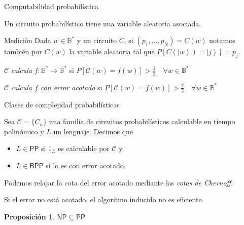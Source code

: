 \documentclass[ignorenonframetext,aspectratio=43,]{beamer}
\providecommand{\tightlist}{%
  \setlength{\itemsep}{0pt}\setlength{\parskip}{0pt}}
\newtheorem{proposicion}{Proposición}
\newcommand{\ket}[1]{\left|#1\right\rangle}
\newcommand{\BB}{\mathbb{B}}
\begin{document}
\begin{frame}{Computabilidad probabilística}

  Un circuito probabilístico tiene una variable aleatoria asociada.

  \begin{block}{Medición}
    Dada $w \in \BB^\ast$ y un circuito $C$, si $(p_1, \dots, p_N) = C(w)$ notamos también por $C(w)$
    la variable aleatoria tal que $P[C(\ket{w}) = \ket{j}] = p_j.$
  \end{block}

  \pause

  \begin{definition}
    $\mathcal{C}$ \emph{calcula} $f: \BB^\ast \to \BB^\ast$ si
    $P[\mathcal{C}(w) = f(w)] > \frac12 \quad \forall w \in \BB^\ast$
  \end{definition}

  \begin{definition}
    $\mathcal{C}$ \emph{calcula $f$ con error acotado} si
    $P[\mathcal{C}(w) = f(w)] > \frac23 \quad \forall w \in \BB^\ast$
  \end{definition}

\end{frame}


\begin{frame}{Clases de complejidad probabilísticas}

  \begin{definition}
    Sea $\mathcal{C} = \{C_n\}$ una familia de circuitos probabilísticos calculable en tiempo polinómico y $L$ un lenguaje. Decimos que
    \begin{itemize}
      \tightlist
    \item $L \in \mathsf{PP}$ si $1_L$ es calculable por $\mathcal{C}$ y
    \item $L \in \mathsf{BPP}$ si lo es con error acotado.
    \end{itemize}
  \end{definition}

  Podemos relajar la cota del error acotado mediante las \emph{cotas de Chernoff}.

  \pause

  Si el error no está acotado, el algoritmo inducido no es eficiente.

  \begin{proposicion}
    $\mathsf{NP} \subseteq \mathsf{PP}$
  \end{proposicion}

\end{frame}
\end{document}
